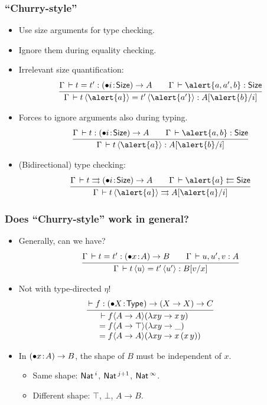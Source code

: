 \documentclass[t,fleqn]{beamer}
\makeatletter
\renewcommand{\ru}[2]{\dfrac{\begin{array}[b]{@{}c@{}} #1 \end{array}}{\begin{array}[t]{@{}l@{}} #2 \end{array}}}
\newcommand{\cAnn}{\color{red!80!black}}%
\renewcommand{\emph}[1]{{\cAnn#1}}
\newcommand{\irr}{\mathord{\bullet}}
\renewcommand{\erhyp}[3][\irr]{#1#2 \of #3}
\renewcommand{\erfunT}[4][\irr]{(\erhyp[#1]{#2}{#3}) \to #4}
\makeatother
\begin{document}
\begin{frame}%
  \frametitle{``Churry-style''}
  \vspace{-3ex}
  \begin{itemize}
  \item Use size arguments for \emph{type checking}.
  \item Ignore them during \emph{equality checking}.
  \item Irrelevant size quantification:
\[
  \ru{\Gamma \der t = t' : \erfunT i \Size A \qquad
      \Gamma \der \alert{a,a',b} : \Size
    }{\Gamma \der t\,\ann{\alert{a}} = t'\,\ann{\alert{a'}} : A[\alert{b}/i]
    }
\]
\vspace{-2ex}
  \item Forces to ignore arguments also during \emph{typing}.
\[
  \ru{\Gamma \der t : \erfunT i \Size A \qquad
      \Gamma \der \alert{a,b} : \Size
    }{\Gamma \der t\,\ann{\alert{a}} : A[\alert{b}/i]
    }
\]
\vspace{-2ex}
\item (Bidirectional) \emph{type checking}:
\[
  \ru{\Gamma \der t \jinf\erfunT i \Size A \qquad
      \Gamma \der \alert{a} \jchk \Size
    }{\Gamma \der t\,\ann{\alert{a}} \jinf A[\alert{a}/i]
    }
\]
\vspace{-2ex}
  \end{itemize}
\end{frame}


\begin{frame}%
  \frametitle{Does ``Churry-style'' work in general?}
\vspace{-3ex}
  \begin{itemize}
  \item Generally, can we have?
\[
  \ru{\Gamma \der t = t' : \erfunT x A B\qquad
      \Gamma \der u,u',v : A
    }{\Gamma \der t\,\ann u = t'\,\ann{u'} : B[v/x]
    }
\]
\vspace{-2ex}
  \item Not with type-directed $\eta$!
\[
\hspace{-\leftmargin}
\ru{\der f : \erfunT X \Type (X \to X) \to C
  }{\der
    f \ann {A \to A} (\lambda x y \to x\,y) \\ =
    f \ann {A \to \top} (\lambda x y \to \_) \\ =
    f \ann {A \to A} (\lambda x y \to x\,(x\,y))
  }
\]
\vspace{-2ex}
  \item In $\erfunT x A B$, the \emph{shape} of $B$ must be
    independent of $x$.
    \begin{itemize}
    \item Same shape: $\mathsf{Nat}\,^i$, $\mathsf{Nat}\,^{j+1}$, $\mathsf{Nat}\,^\infty$.
    \item Different shape: $\top$, $\bot$, $A \to B$.
    \end{itemize}
\end{itemize}
\end{frame}
\end{document}
